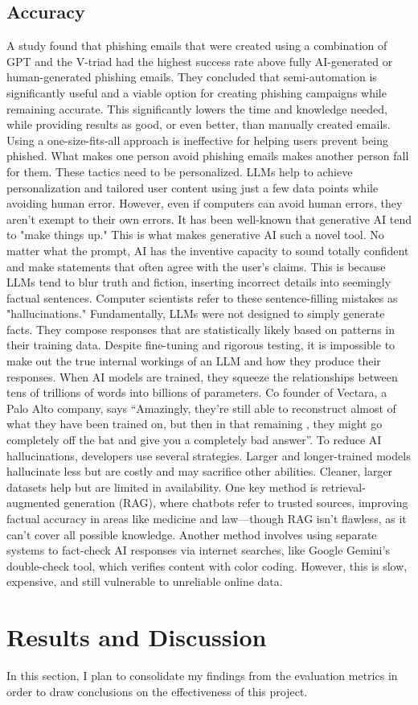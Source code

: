 \documentclass[10pt,twocolumn]{article}
\begin{document}
\subsection{Accuracy}
A study found that phishing emails that were created using a combination of GPT and the V-triad had the highest success rate above fully AI-generated or human-generated phishing emails.\cite{llm_vs_human} They concluded that semi-automation is significantly useful and a viable option for creating phishing campaigns while remaining accurate. This significantly lowers the time and knowledge needed, while providing results as good, or even better, than manually created emails. Using a one-size-fits-all approach is ineffective for helping users prevent being phished. What makes one person avoid phishing emails makes another person fall for them. These tactics need to be personalized. LLMs help to achieve personalization and tailored user content using just a few data points while avoiding human error. 
However, even if computers can avoid human errors, they aren't exempt to their own errors. It has been well-known that generative AI tend to "make things up." This is what makes generative AI such a novel tool. No matter what the prompt, AI has the inventive capacity to sound totally confident and make statements that often agree with the user's claims. This is because LLMs tend to blur truth and fiction, inserting incorrect details into seemingly factual sentences. Computer scientists refer to these sentence-filling mistakes as "hallucinations." 
Fundamentally, LLMs were not designed to simply generate facts. They compose responses that are statistically likely based on patterns in their training data. Despite fine-tuning and rigorous testing, it is impossible to make out the true internal workings of an LLM and how they produce their responses. When AI models are trained, they squeeze the relationships between tens of trillions of words into billions of parameters. Co founder of Vectara, a Palo Alto company, says “Amazingly, they’re still able to reconstruct almost  of what they have been trained on, but then in that remaining , they might go completely off the bat and give you a completely bad answer”. 
To reduce AI hallucinations, developers use several strategies. Larger and longer-trained models hallucinate less but are costly and may sacrifice other abilities. Cleaner, larger datasets help but are limited in availability. One key method is retrieval-augmented generation (RAG), where chatbots refer to trusted sources, improving factual accuracy in areas like medicine and law—though RAG isn’t flawless, as it can't cover all possible knowledge. Another method involves using separate systems to fact-check AI responses via internet searches, like Google Gemini’s double-check tool, which verifies content with color coding. However, this is slow, expensive, and still vulnerable to unreliable online data.\cite{hallucinate}

\section{Results and Discussion}
In this section, I plan to consolidate my findings from the evaluation metrics in order to draw conclusions on the effectiveness of this project. 







\appendix



\printbibliography 
\end{document}
